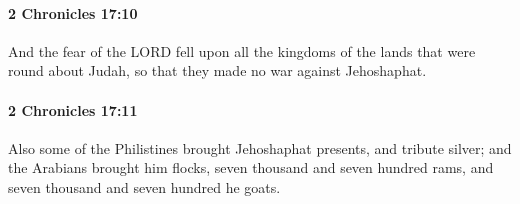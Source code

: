 		\paragraph{2 Chronicles 17:10} %
			\label{2CHRONICLES-17-10}

			And the fear of the LORD fell upon all the kingdoms of the lands that were round about Judah, so that they made no war against Jehoshaphat.


		\paragraph{2 Chronicles 17:11} %
			\label{2CHRONICLES-17-11}

			Also some of the Philistines brought Jehoshaphat presents, and tribute silver; and the Arabians brought him flocks, seven thousand and seven hundred rams, and seven thousand and seven hundred he goats.

